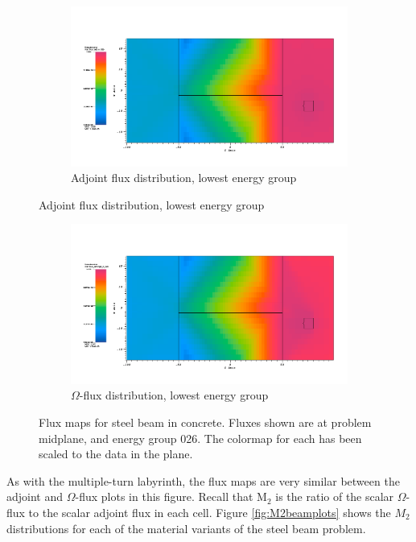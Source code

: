 \begin{figure}[htb!]
  \centering
  \begin{subfigure}[t]{\textwidth}
    \includegraphics[width=0.9\linewidth]{./chapters/characterization_probs/figures/char/prob_1/prob1adjG26.png}
    \caption{Adjoint flux distribution, lowest energy group}
    \label{fig:steelbeamadj}
  \end{subfigure}
\end{figure}
\begin{figure}[htb!]\ContinuedFloat
  \centering
  \begin{subfigure}[t]{\textwidth}
    \includegraphics[width=0.9\linewidth]{./chapters/characterization_probs/figures/char/prob_1/prob1omegaG26.png}
    \caption{$\Omega$-flux distribution, lowest energy group}
    \label{fig:steelbeamomega}
  \end{subfigure}
  \caption[Flux maps for steel beam in concrete.]{Flux maps for steel beam in
  concrete. Fluxes shown are at problem midplane, and energy group 026. The
  colormap for each has been scaled to the data in the plane.}
  \label{fig:steelbeamfluxes}
\end{figure}

As with the multiple-turn
labyrinth, the flux maps are very similar between the adjoint and $\Omega$-flux
plots in this figure. Recall that M$_2$ is the ratio of the scalar $\Omega$-flux
to the scalar adjoint flux in each cell. Figure \ref{fig:M2beamplots} shows the
$M_2$ distributions for each of the material variants of the steel beam problem.

